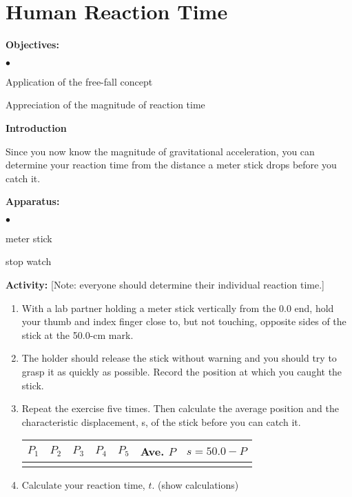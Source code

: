 
\section{Human Reaction Time}

\makelabheader %

{\noindent \bf Objectives:} \begin{list}{$\bullet$}{\itemsep0pt }

\item Application of the free-fall concept \item Appreciation of the magnitude of reaction time

\end{list}

{\noindent \bf Introduction}

{\noindent Since you now know the magnitude of gravitational acceleration, you can determine your reaction time from the distance a meter stick drops before you catch it.} 
\vspace{0.2in}

{\noindent \bf Apparatus:} \begin{list}{$\bullet$}{\itemsep0pt }

\item meter stick \item stop watch

\end{list}

{\noindent \bf Activity:} [Note: everyone should determine their individual reaction time.]

\begin{enumerate}

\item With a lab partner holding a meter stick vertically from the 0.0 end, hold your thumb and index finger close to, but not touching, opposite sides of the stick at the 50.0-cm mark.

\item The holder should release the stick without warning and you should try to grasp it as quickly as possible. Record the position at which you caught the stick.

\item Repeat the exercise five times. Then calculate the average position and the characteristic displacement, s, of the stick before you can catch it.

\begin{center} \begin{tabular}{|c|c|c|c|c|c|c|} \hline $P_1$ & $P_2$ & $P_3$ & $P_4$ & $P_5$ & Ave. $P$ & $s = 50.0 - P$ \\ \hline \hline & & & & & & \\ \hline \end{tabular} \end{center}

\item Calculate your reaction time, $t$. (show calculations)

\bigskip \bigskip

 \end{enumerate}

